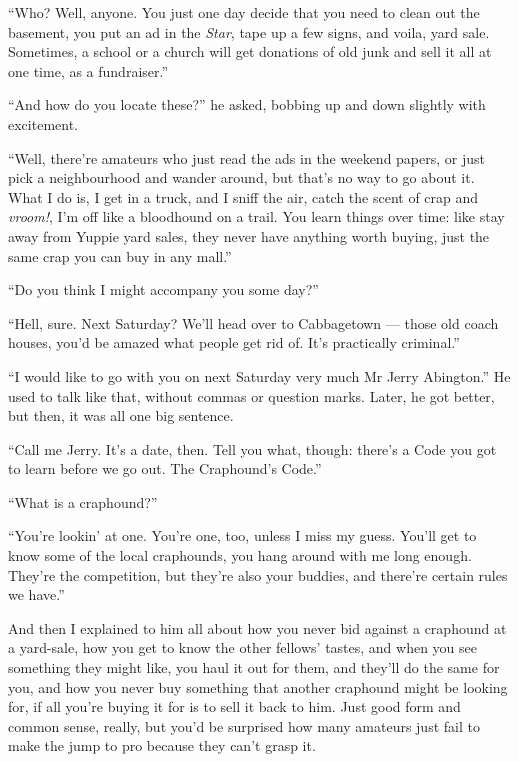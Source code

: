 ``Who? Well, anyone. You just one day decide that you need to clean out 
the basement, you put an ad in the \emph{Star}, tape up a few signs, 
and voila, yard sale. Sometimes, a school or a church will get 
donations of old junk and sell it all at one time, as a fundraiser.''

``And how do you locate these?'' he asked, bobbing up and down
slightly with excitement.

``Well, there're amateurs who just read the ads in the weekend 
papers, or just pick a neighbourhood and wander around, but that's 
no way to go about it. What I do is, I get in a truck, and I sniff the 
air, catch the scent of crap and \emph{vroom!}, I'm off like a 
bloodhound on a trail. You learn things over time: like stay away 
from Yuppie yard sales, they never have anything worth buying, just 
the same crap you can buy in any mall.''

``Do you think I might accompany you some day?''

``Hell, sure. Next Saturday? We'll head over to Cabbagetown --- those 
old coach houses, you'd be amazed what people get rid of. It's 
practically criminal.''

``I would like to go with you on next Saturday very much Mr Jerry Abington.''
He used to talk like that, without commas or question marks. Later,
he got better, but then, it was all one big sentence.

``Call me Jerry. It's a date, then. Tell you what, though: there's a 
Code you got to learn before we go out. The Craphound's Code.''

``What is a craphound?''

``You're lookin' at one. You're one, too, unless I miss my guess. You'll 
get to know some of the local craphounds, you hang around with me long 
enough. They're the competition, but they're also your buddies, and 
there're certain rules we have.''

And then I explained to him all about how you never bid against a
craphound at a yard-sale, how you get to know the other fellows'
tastes, and when you see something they might like, you haul it out
for them, and they'll do the same for you, and how you never buy
something that another craphound might be looking for, if all
you're buying it for is to sell it back to him. Just good form and
common sense, really, but you'd be surprised how many amateurs just
fail to make the jump to pro because they can't grasp it.

\tb

